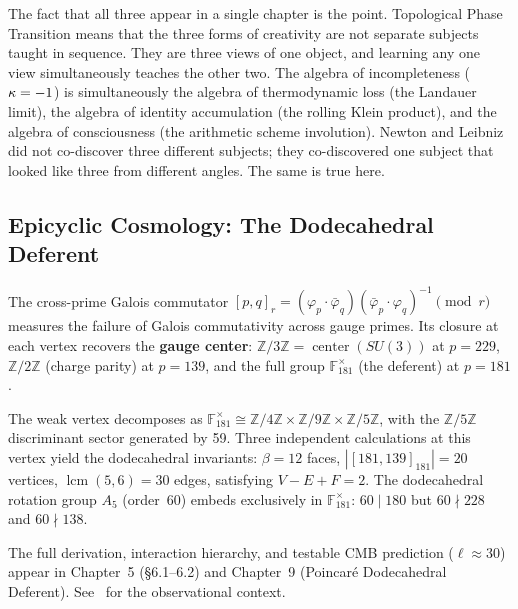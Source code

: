 The fact that all three appear in a single chapter is the point. Topological Phase Transition means that the three forms of creativity are not separate subjects taught in sequence. They are three views of one object, and learning any one view simultaneously teaches the other two. The algebra of incompleteness ($\kappa = -1$) is simultaneously the algebra of thermodynamic loss (the Landauer limit), the algebra of identity accumulation (the rolling Klein product), and the algebra of consciousness (the arithmetic scheme involution). Newton and Leibniz did not co-discover three different subjects; they co-discovered one subject that looked like three from different angles. The same is true here.

\subsection{Epicyclic Cosmology: The Dodecahedral Deferent}

The cross-prime Galois commutator $[p,q]_r = (\varphi_p \cdot \bar{\varphi}_q)(\bar{\varphi}_p \cdot \varphi_q)^{-1} \pmod{r}$ measures the failure of Galois commutativity across gauge primes. Its closure at each vertex recovers the \textbf{gauge center}: $\mathbb{Z}/3\mathbb{Z} = \operatorname{center}(SU(3))$ at $p=229$, $\mathbb{Z}/2\mathbb{Z}$ (charge parity) at $p=139$, and the full group $\mathbb{F}_{181}^{\times}$ (the deferent) at $p=181$.

The weak vertex decomposes as $\mathbb{F}_{181}^{\times} \cong \mathbb{Z}/4\mathbb{Z} \times \mathbb{Z}/9\mathbb{Z} \times \mathbb{Z}/5\mathbb{Z}$, with the $\mathbb{Z}/5\mathbb{Z}$ discriminant sector generated by 59. Three independent calculations at this vertex yield the dodecahedral invariants: $\beta = 12$ faces, $|[181,139]_{181}| = 20$ vertices, $\operatorname{lcm}(5,6) = 30$ edges, satisfying $V - E + F = 2$. The dodecahedral rotation group $A_5$ (order~60) embeds exclusively in $\mathbb{F}_{181}^{\times}$: $60 \mid 180$ but $60 \nmid 228$ and $60 \nmid 138$.

The full derivation, interaction hierarchy, and testable CMB prediction ($\ell \approx 30$) appear in Chapter~5 (\S6.1--6.2) and Chapter~9 (Poincar\'{e} Dodecahedral Deferent). See~\cite{luminet2003, planck2020} for the observational context.

